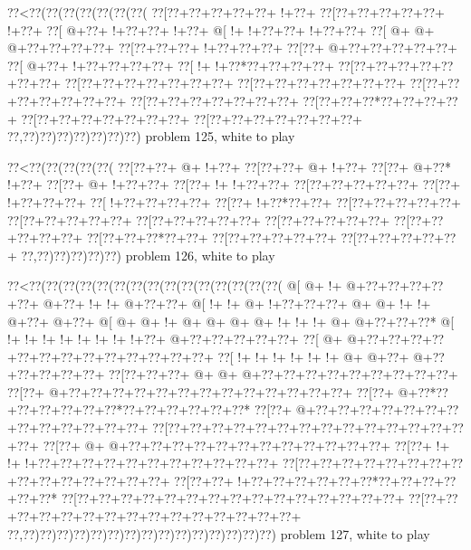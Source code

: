 \vbox{\vbox{\goo
\0??<\0??(\0??(\0??(\0??(\0??(\0??(\0??(
\0??[\0??+\0??+\0??+\0??+\0??+\- !+\0??+
\0??[\0??+\0??+\0??+\0??+\0??+\- !+\0??+
\0??[\- @+\0??+\- !+\0??+\0??+\- !+\0??+
\- @[\- !+\- !+\0??+\0??+\- !+\0??+\0??+
\0??[\- @+\- @+\- @+\0??+\0??+\0??+\0??+
\0??[\0??+\0??+\0??+\- !+\0??+\0??+\0??+
\0??[\0??+\- @+\0??+\0??+\0??+\0??+\0??+
\0??[\- @+\0??+\- !+\0??+\0??+\0??+\0??+
\0??[\- !+\- !+\0??*\0??+\0??+\0??+\0??+
\0??[\0??+\0??+\0??+\0??+\0??+\0??+\0??+
\0??[\0??+\0??+\0??+\0??+\0??+\0??+\0??+
\0??[\0??+\0??+\0??+\0??+\0??+\0??+\0??+
\0??[\0??+\0??+\0??+\0??+\0??+\0??+\0??+
\0??[\0??+\0??+\0??+\0??+\0??+\0??+\0??+
\0??[\0??+\0??+\0??*\0??+\0??+\0??+\0??+
\0??[\0??+\0??+\0??+\0??+\0??+\0??+\0??+
\0??[\0??+\0??+\0??+\0??+\0??+\0??+\0??+
\0??,\0??)\0??)\0??)\0??)\0??)\0??)\0??)
}
\hfil problem 125, white to play\hfil\break
}

\vbox{\vbox{\goo
\0??<\0??(\0??(\0??(\0??(\0??(
\0??[\0??+\0??+\- @+\- !+\0??+
\0??[\0??+\0??+\- @+\- !+\0??+
\0??[\0??+\- @+\0??*\- !+\0??+
\0??[\0??+\- @+\- !+\0??+\0??+
\0??[\0??+\- !+\- !+\0??+\0??+
\0??[\0??+\0??+\0??+\0??+\0??+
\0??[\0??+\- !+\0??+\0??+\0??+
\0??[\- !+\0??+\0??+\0??+\0??+
\0??[\0??+\- !+\0??*\0??+\0??+
\0??[\0??+\0??+\0??+\0??+\0??+
\0??[\0??+\0??+\0??+\0??+\0??+
\0??[\0??+\0??+\0??+\0??+\0??+
\0??[\0??+\0??+\0??+\0??+\0??+
\0??[\0??+\0??+\0??+\0??+\0??+
\0??[\0??+\0??+\0??*\0??+\0??+
\0??[\0??+\0??+\0??+\0??+\0??+
\0??[\0??+\0??+\0??+\0??+\0??+
\0??,\0??)\0??)\0??)\0??)\0??)
}
\hfil problem 126, white to play\hfil\break
}

\vbox{\vbox{\goo
\0??<\0??(\0??(\0??(\0??(\0??(\0??(\0??(\0??(\0??(\0??(\0??(\0??(\0??(\0??(\0??(
\- @[\- @+\- !+\- @+\0??+\0??+\0??+\0??+\0??+\- @+\0??+\- !+\- !+\- @+\0??+\0??+
\- @[\- !+\- !+\- @+\- !+\0??+\0??+\0??+\- @+\- @+\- !+\- !+\- @+\0??+\- @+\0??+
\- @[\- @+\- @+\- !+\- @+\- @+\- @+\- @+\- !+\- !+\- !+\- @+\- @+\0??+\0??+\0??*
\- @[\- !+\- !+\- !+\- !+\- !+\- !+\- !+\- !+\0??+\- @+\0??+\0??+\0??+\0??+\0??+
\0??[\- @+\- @+\0??+\0??+\0??+\0??+\0??+\0??+\0??+\0??+\0??+\0??+\0??+\0??+\0??+
\0??[\- !+\- !+\- !+\- !+\- !+\- !+\- @+\- @+\0??+\- @+\0??+\0??+\0??+\0??+\0??+
\0??[\0??+\0??+\0??+\- @+\- @+\- @+\0??+\0??+\0??+\0??+\0??+\0??+\0??+\0??+\0??+
\0??[\0??+\- @+\0??+\0??+\0??+\0??+\0??+\0??+\0??+\0??+\0??+\0??+\0??+\0??+\0??+
\0??[\0??+\- @+\0??*\0??+\0??+\0??+\0??+\0??+\0??*\0??+\0??+\0??+\0??+\0??+\0??*
\0??[\0??+\- @+\0??+\0??+\0??+\0??+\0??+\0??+\0??+\0??+\0??+\0??+\0??+\0??+\0??+
\0??[\0??+\0??+\0??+\0??+\0??+\0??+\0??+\0??+\0??+\0??+\0??+\0??+\0??+\0??+\0??+
\0??[\0??+\- @+\- @+\0??+\0??+\0??+\0??+\0??+\0??+\0??+\0??+\0??+\0??+\0??+\0??+
\0??[\0??+\- !+\- !+\- !+\0??+\0??+\0??+\0??+\0??+\0??+\0??+\0??+\0??+\0??+\0??+
\0??[\0??+\0??+\0??+\0??+\0??+\0??+\0??+\0??+\0??+\0??+\0??+\0??+\0??+\0??+\0??+
\0??[\0??+\0??+\- !+\0??+\0??+\0??+\0??+\0??+\0??*\0??+\0??+\0??+\0??+\0??+\0??*
\0??[\0??+\0??+\0??+\0??+\0??+\0??+\0??+\0??+\0??+\0??+\0??+\0??+\0??+\0??+\0??+
\0??[\0??+\0??+\0??+\0??+\0??+\0??+\0??+\0??+\0??+\0??+\0??+\0??+\0??+\0??+\0??+
\0??,\0??)\0??)\0??)\0??)\0??)\0??)\0??)\0??)\0??)\0??)\0??)\0??)\0??)\0??)\0??)
}
\hfil problem 127, white to play\hfil\break
}


